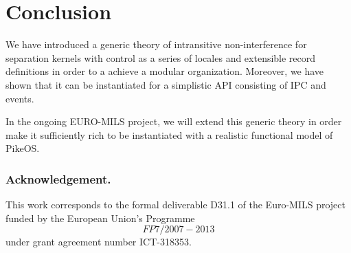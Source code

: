 \documentclass[11pt,a4paper]{article}
\begin{document}

\section{Conclusion}

We have introduced a generic theory of intransitive non-interference for separation 
kernels with control as a series of locales and extensible record definitions in order
to a achieve a modular organization.
Moreover, we have shown that it can be instantiated for a simplistic API consisting of IPC 
and events.

In the ongoing EURO-MILS project, we will extend this generic theory in order make it
sufficiently rich to be instantiated with a realistic functional model of PikeOS.

\subsubsection{Acknowledgement.}This work corresponds to the formal deliverable D31.1 
of the Euro-MILS project funded  by the European Union’s Programme \[FP7/2007-2013\] 
under grant agreement number ICT-318353.



\end{document}
